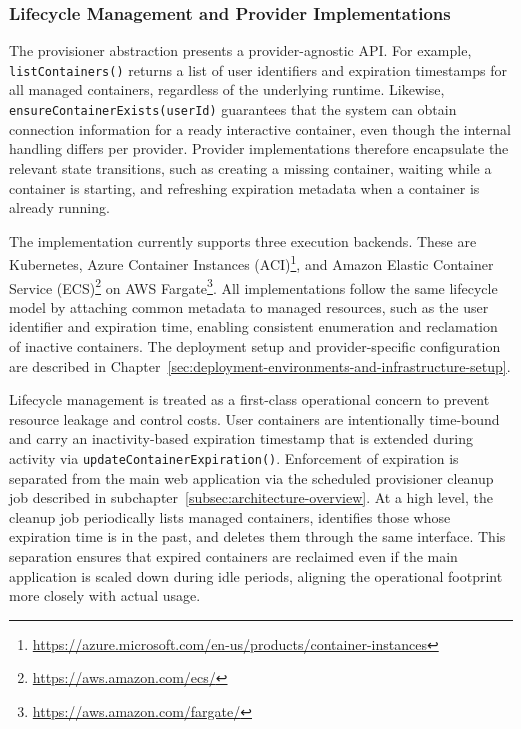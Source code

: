 \subsubsection{Lifecycle Management and Provider Implementations} \label{subsubsec:lifecycle-management-and-provider-implementations}
The provisioner abstraction presents a provider-agnostic API\@.
For example, \texttt{listContainers()} returns a list of user identifiers and expiration timestamps for all managed containers, regardless of the underlying runtime.
Likewise, \texttt{ensureContainerExists(userId)} guarantees that the system can obtain connection information for a ready interactive container, even though the internal handling differs per provider.
Provider implementations therefore encapsulate the relevant state transitions, such as creating a missing container, waiting while a container is starting, and refreshing expiration metadata when a container is already running.

The implementation currently supports three execution backends.
These are Kubernetes, Azure Container Instances (ACI)\footnote{\url{https://azure.microsoft.com/en-us/products/container-instances}}, and Amazon Elastic Container Service (ECS)\footnote{\url{https://aws.amazon.com/ecs/}} on AWS Fargate\footnote{\url{https://aws.amazon.com/fargate/}}.
All implementations follow the same lifecycle model by attaching common metadata to managed resources, such as the user identifier and expiration time, enabling consistent enumeration and reclamation of inactive containers.
The deployment setup and provider-specific configuration are described in Chapter~\ref{sec:deployment-environments-and-infrastructure-setup}.

Lifecycle management is treated as a first-class operational concern to prevent resource leakage and control costs.
User containers are intentionally time-bound and carry an inactivity-based expiration timestamp that is extended during activity via \texttt{updateContainerExpiration()}.
Enforcement of expiration is separated from the main web application via the scheduled provisioner cleanup job described in subchapter~\ref{subsec:architecture-overview}.
At a high level, the cleanup job periodically lists managed containers, identifies those whose expiration time is in the past, and deletes them through the same interface.
This separation ensures that expired containers are reclaimed even if the main application is scaled down during idle periods, aligning the operational footprint more closely with actual usage.

